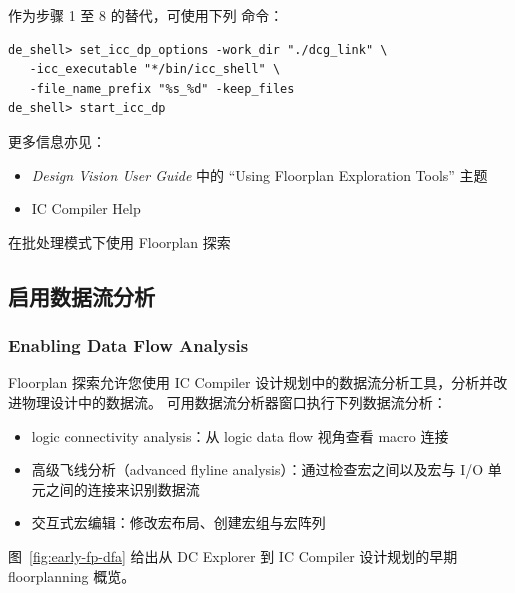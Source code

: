 
作为步骤 1 至 8 的替代，可使用下列  命令：
\begin{lstlisting}
de_shell> set_icc_dp_options -work_dir "./dcg_link" \
   -icc_executable "*/bin/icc_shell" \
   -file_name_prefix "%s_%d" -keep_files
de_shell> start_icc_dp
\end{lstlisting}

更多信息亦见：
\begin{itemize}
  \item \textit{Design Vision User Guide} 中的 ``Using Floorplan Exploration Tools'' 主题
  \item IC Compiler Help
\end{itemize}

\begin{seeAlsoBox}
在批处理模式下使用 Floorplan 探索
\end{seeAlsoBox}

\subsection{启用数据流分析}
\subsubsection*{Enabling Data Flow Analysis}

Floorplan 探索允许您使用 IC Compiler 设计规划中的数据流分析工具，分析并改进物理设计中的数据流。
可用数据流分析器窗口执行下列数据流分析：
\begin{itemize}
  \item logic connectivity analysis：从 logic data flow 视角查看 macro 连接
  \item 高级飞线分析（advanced flyline analysis）：通过检查宏之间以及宏与 I/O 单元之间的连接来识别数据流
  \item 交互式宏编辑：修改宏布局、创建宏组与宏阵列
\end{itemize}

图~\ref{fig:early-fp-dfa} 给出从 DC Explorer 到 IC Compiler 设计规划的早期 floorplanning 概览。


